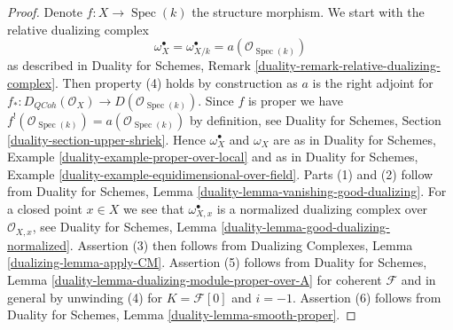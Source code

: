 \documentclass[10pt,a4paper]{amsart}
\theoremstyle{plain}
\theoremstyle{definition}
\theoremstyle{remark}
\numberwithin{equation}{subsection}
\def\Spec{\mathop{\mathrm{Spec}}}
\def\QCoh{\mathit{QCoh}}
\begin{document}
\begin{proof}
Denote $f : X \to \Spec(k)$ the structure morphism.
We start with the relative dualizing complex
$$
\omega_X^\bullet = \omega_{X/k}^\bullet = a(\mathcal{O}_{\Spec(k)})
$$
as described in Duality for Schemes,
Remark \ref{duality-remark-relative-dualizing-complex}.
Then property (4) holds by construction as $a$ is the right
adjoint for $f_* : D_\QCoh(\mathcal{O}_X) \to D(\mathcal{O}_{\Spec(k)})$.
Since $f$ is proper we have
$f^!(\mathcal{O}_{\Spec(k)}) = a(\mathcal{O}_{\Spec(k)})$ by
definition, see
Duality for Schemes, Section \ref{duality-section-upper-shriek}.
Hence $\omega_X^\bullet$ and $\omega_X$ are as in
Duality for Schemes, Example \ref{duality-example-proper-over-local}
and as in
Duality for Schemes, Example \ref{duality-example-equidimensional-over-field}.
Parts (1) and (2) follow from
Duality for Schemes, Lemma \ref{duality-lemma-vanishing-good-dualizing}.
For a closed point $x \in X$ we see that $\omega_{X, x}^\bullet$ is a
normalized dualizing complex over $\mathcal{O}_{X, x}$, see
Duality for Schemes, Lemma \ref{duality-lemma-good-dualizing-normalized}.
Assertion (3) then follows from
Dualizing Complexes, Lemma \ref{dualizing-lemma-apply-CM}.
Assertion (5) follows from
Duality for Schemes, Lemma \ref{duality-lemma-dualizing-module-proper-over-A}
for coherent $\mathcal{F}$ and in general by unwinding
(4) for $K = \mathcal{F}[0]$ and $i = -1$.
Assertion (6) follows from Duality for Schemes,
Lemma \ref{duality-lemma-smooth-proper}.
\end{proof}
\end{document}
